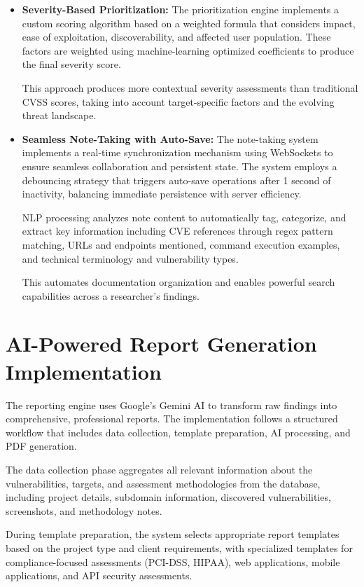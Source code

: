 \documentclass[conference]{IEEEtran}
\begin{document}
\begin{itemize}
    \item \textbf{Severity-Based Prioritization:} 
    The prioritization engine implements a custom scoring algorithm based on a weighted formula that considers impact, ease of exploitation, discoverability, and affected user population. These factors are weighted using machine-learning optimized coefficients to produce the final severity score.
    
    This approach produces more contextual severity assessments than traditional CVSS scores, taking into account target-specific factors and the evolving threat landscape.

    \item \textbf{Seamless Note-Taking with Auto-Save:} 
    The note-taking system implements a real-time synchronization mechanism using WebSockets to ensure seamless collaboration and persistent state. The system employs a debouncing strategy that triggers auto-save operations after 1 second of inactivity, balancing immediate persistence with server efficiency.

    NLP processing analyzes note content to automatically tag, categorize, and extract key information including CVE references through regex pattern matching, URLs and endpoints mentioned, command execution examples, and technical terminology and vulnerability types.
    
    This automates documentation organization and enables powerful search capabilities across a researcher's findings.
\end{itemize}

\section{AI-Powered Report Generation Implementation}
The reporting engine uses Google's Gemini AI to transform raw findings into comprehensive, professional reports. The implementation follows a structured workflow that includes data collection, template preparation, AI processing, and PDF generation.

The data collection phase aggregates all relevant information about the vulnerabilities, targets, and assessment methodologies from the database, including project details, subdomain information, discovered vulnerabilities, screenshots, and methodology notes.

During template preparation, the system selects appropriate report templates based on the project type and client requirements, with specialized templates for compliance-focused assessments (PCI-DSS, HIPAA), web applications, mobile applications, and API security assessments.
\end{document}
